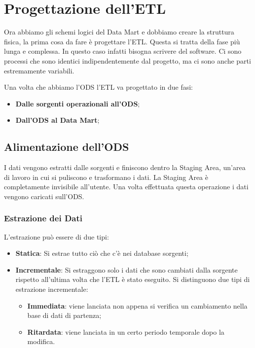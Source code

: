 \section{Progettazione dell'ETL}
Ora abbiamo gli schemi logici del Data Mart e dobbiamo creare la struttura fisica, la prima cosa da fare è progettare l'ETL. Questa si tratta della fase più lunga e complessa. In questo caso infatti bisogna scrivere del software. Ci sono processi che sono identici indipendentemente dal progetto, ma ci sono anche parti estremamente variabili.

Una volta che abbiamo l'ODS l'ETL va progettato in due fasi:
\begin{itemize}
	\item \textbf{Dalle sorgenti operazionali all'ODS};
	\item \textbf{Dall'ODS al Data Mart};
\end{itemize}

\subsection{Alimentazione dell'ODS}
I dati vengono estratti dalle sorgenti e finiscono dentro la Staging Area, un'area di lavoro in cui si puliscono e trasformano i dati. La Staging Area è completamente invisibile all'utente. Una volta effettuata questa operazione i dati vengono caricati sull'ODS.


\subsubsection{Estrazione dei Dati}

\noindent L'estrazione può essere di due tipi:
\begin{itemize}
	\item \textbf{Statica}: Si estrae tutto ciò che c'è nei database sorgenti;
	\item \textbf{Incrementale}: Si estraggono solo i dati che sono cambiati dalla sorgente rispetto all'ultima volta che l'ETL è stato eseguito. Si distinguono due tipi di estrazione incrementale:
	\begin{itemize}
		\item \textbf{Immediata}: viene lanciata non appena si verifica un cambiamento nella base di dati di partenza;
		\item \textbf{Ritardata}: viene lanciata in un certo periodo temporale dopo la modifica.
	\end{itemize}
\end{itemize}

